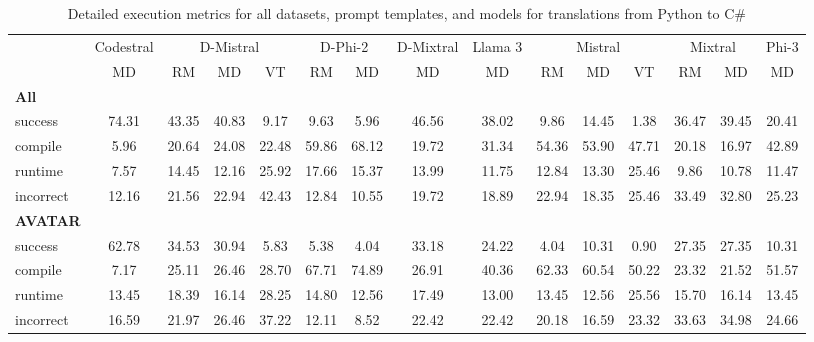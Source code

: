 \begin{table}[t]
\caption{Detailed execution metrics for all datasets, prompt templates, and models for translations from Python to C\#}
\label{tab:iteration_1_stats_percent_Python_Csharp}

\setlength{\tabcolsep}{2.5pt} %
\renewcommand{\arraystretch}{1} %

\footnotesize
\begin{tabular}{@{}lcccccccccccccc@{}}
\toprule
 & Codestral & \multicolumn{3}{c}{D-Mistral} & \multicolumn{2}{c}{D-Phi-2} & D-Mixtral & Llama 3 & \multicolumn{3}{c}{Mistral}  & \multicolumn{2}{c}{Mixtral} & Phi-3 \\ 

\cmidrule(l){2-2}
\cmidrule(l){3-5}
\cmidrule(l){6-7}
\cmidrule(l){8-8}
\cmidrule(l){9-9}
\cmidrule(l){10-12}
\cmidrule(l){13-14}
\cmidrule(l){15-15}

& \multicolumn{1}{c}{MD}
& \multicolumn{1}{c}{RM}
& \multicolumn{1}{c}{MD}
& \multicolumn{1}{c}{VT}
& \multicolumn{1}{c}{RM}
& \multicolumn{1}{c}{MD} 
& \multicolumn{1}{c}{MD} 
& \multicolumn{1}{c}{MD} 
& \multicolumn{1}{c}{RM} 
& \multicolumn{1}{c}{MD} 
& \multicolumn{1}{c}{VT} 
& \multicolumn{1}{c}{RM}
& \multicolumn{1}{c}{MD} 
& \multicolumn{1}{c}{MD} \\

\midrule
\textbf{All} & & & & & & & & & & & & & & \\ 
\quad success & 74.31 & 43.35 & 40.83 & 9.17 & 9.63 & 5.96 & 46.56 & 38.02 & 9.86 & 14.45 & 1.38 & 36.47 & 39.45 & 20.41 \\
\qquad compile & 5.96 & 20.64 & 24.08 & 22.48 & 59.86 & 68.12 & 19.72 & 31.34 & 54.36 & 53.90 & 47.71 & 20.18 & 16.97 & 42.89 \\
\qquad runtime & 7.57 & 14.45 & 12.16 & 25.92 & 17.66 & 15.37 & 13.99 & 11.75 & 12.84 & 13.30 & 25.46 & 9.86 & 10.78 & 11.47 \\
\qquad incorrect & 12.16 & 21.56 & 22.94 & 42.43 & 12.84 & 10.55 & 19.72 & 18.89 & 22.94 & 18.35 & 25.46 & 33.49 & 32.80 & 25.23 \\
 

\textbf{AVATAR} & & & & & & & & & & & & & & \\
\quad success & 62.78 & 34.53 & 30.94 & 5.83 & 5.38 & 4.04 & 33.18 & 24.22 & 4.04 & 10.31 & 0.90 & 27.35 & 27.35 & 10.31 \\
\qquad compile & 7.17 & 25.11 & 26.46 & 28.70 & 67.71 & 74.89 & 26.91 & 40.36 & 62.33 & 60.54 & 50.22 & 23.32 & 21.52 & 51.57 \\
\qquad runtime & 13.45 & 18.39 & 16.14 & 28.25 & 14.80 & 12.56 & 17.49 & 13.00 & 13.45 & 12.56 & 25.56 & 15.70 & 16.14 & 13.45 \\
\qquad incorrect & 16.59 & 21.97 & 26.46 & 37.22 & 12.11 & 8.52 & 22.42 & 22.42 & 20.18 & 16.59 & 23.32 & 33.63 & 34.98 & 24.66 \\
 


\end{tabular}
\end{table}
